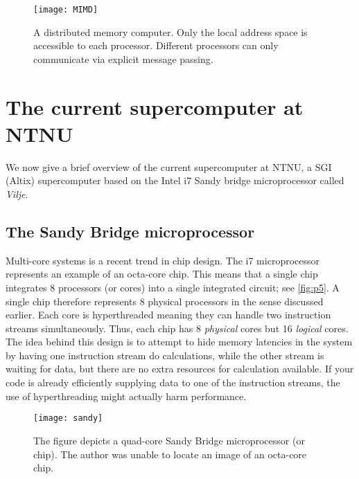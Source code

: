 \begin{figure}[htbp]
  \begin{center}
    \texttt{[image: MIMD]}
  \end{center}
  \caption{
    A distributed memory computer. Only the local address space is accessible to
    each processor. Different processors can only communicate via explicit
    message passing.
  }
  \label{fig:MIMD}
\end{figure}

\section{The current supercomputer at NTNU}

We now give a brief overview of the current supercomputer at NTNU, a SGI (Altix)
supercomputer based on the Intel i7 Sandy bridge microprocessor called
\emph{Vilje}.

\subsection{The Sandy Bridge microprocessor}

Multi-core systems is a recent trend in chip design. The i7 microprocessor
represents an example of an octa-core chip. This means that a single chip
integrates 8 processors (or cores) into a single integrated circuit; see
\autoref{fig:p5}. A single chip therefore represents 8 physical processors in
the sense discussed earlier. Each core is hyperthreaded meaning they can handle
two instruction streams simultaneously. Thus, each chip has 8 \emph{physical}
cores but 16 \emph{logical} cores. The idea behind this design is to attempt to
hide memory latencies in the system by having one instruction stream do
calculations, while the other stream is waiting for data, but there are no extra
resources for calculation available. If your code is already efficiently
supplying data to one of the instruction streams, the use of hyperthreading
might actually harm performance.

\begin{figure}[htbp]
  \begin{center}
    \texttt{[image: sandy]}
  \end{center}
  \caption{
    The figure depicts a quad-core Sandy Bridge microprocessor (or chip). The
    author was unable to locate an image of an octa-core chip.
  }
  \label{fig:p5}
\end{figure}


